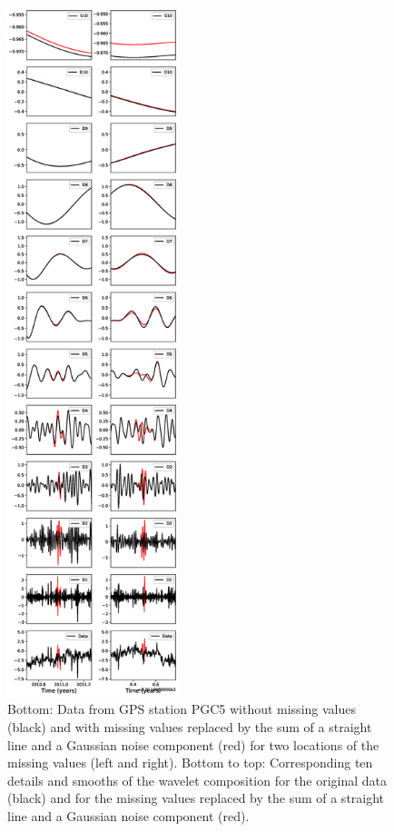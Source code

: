 \documentclass{article}
\begin{document}
\begin{figure}
\noindent\includegraphics[width=5cm, trim={0cm 0cm 0cm 0cm},clip]{figures/DS_10.eps}
\caption{Bottom: Data from GPS station PGC5 without missing values (black) and with missing values replaced by the sum of a straight line and a Gaussian noise component (red) for two locations of the missing values (left and right). Bottom to top: Corresponding ten details and smooths of the wavelet composition for the original data (black) and for the missing values replaced by the sum of a straight line and a Gaussian noise component (red).}
\label{pngfiguresample}
\end{figure}
\end{document}
